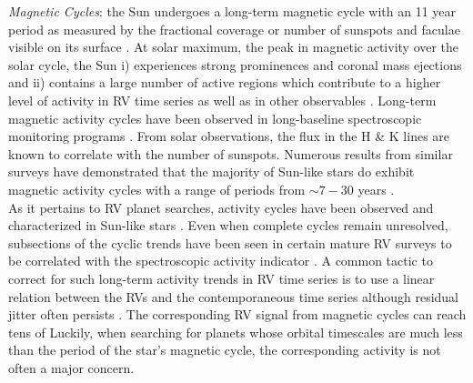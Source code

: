\emph{Magnetic Cycles}:
the Sun undergoes a long-term magnetic cycle with an 11 year period as measured by the
fractional coverage or number of sunspots and faculae visible on its surface \citep{hathaway10}.
At solar maximum, the 
peak in magnetic activity over the solar cycle, the Sun i) experiences strong prominences
and coronal mass ejections and ii) contains a large number of active regions which contribute
to a higher level of activity in RV time series as well as in other observables
\citep{maunder04}. Long-term magnetic activity cycles have been observed in long-baseline
spectroscopic monitoring programs \citep{santos10}. From solar observations, the flux in the
\caii{} H \& K lines are known to correlate with the number of sunspots. Numerous results from
similar surveys have 
demonstrated that the majority of Sun-like stars do exhibit magnetic activity cycles
with a range of periods from $\sim 7-30$ years \citep{duncan91,lockwood97,balinunas98}. \\

As it pertains to RV planet searches, activity cycles have been 
observed and characterized in Sun-like stars \citep{baliunas95}. 
Even when complete cycles remain unresolved, subsections of the cyclic trends have been seen in
certain mature RV surveys to be correlated with
the \Rhk{} spectroscopic activity indicator \citep[e.g.][]{lovis11}.
A common tactic to correct for such long-term activity trends in RV time series is to use a linear
relation between the RVs and the contemporaneous \Rhk{} time series although residual jitter
often persists \citep{dumusque12}. The corresponding RV signal from magnetic cycles can reach tens of
 Luckily, when searching for
planets whose orbital timescales are much less than the period of the star's magnetic cycle, the
corresponding activity is not often a major concern. \\


